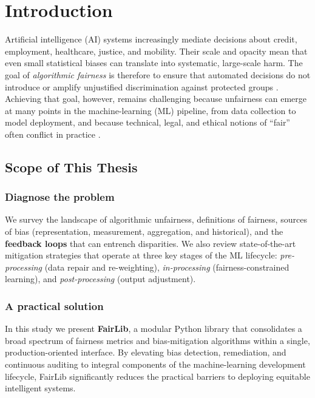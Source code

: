 \documentclass[12pt,a4paper,openright,twoside]{book}
\begin{document}
\tableofcontents   

\mainmatter

\chapter{Introduction}
\label{chap:introduction}
Artificial intelligence (AI) systems increasingly mediate decisions about
credit, employment, healthcare, justice, and mobility.  Their scale and
opacity mean that even small statistical biases can translate into
systematic, large-scale harm.  The goal of \emph{algorithmic fairness} is
therefore to ensure that automated decisions do not introduce or amplify unjustified discrimination against protected groups
\cite{mehrabi2021survey}.  Achieving that goal, however, remains
challenging because unfairness can emerge at many points in the
machine-learning (ML) pipeline, from data collection to model
deployment, and because technical, legal, and ethical notions of
“fair” often conflict in practice \cite{suresh2021framework}.

\section{Scope of This Thesis}
\subsection{Diagnose the problem}
We survey the landscape of algorithmic unfairness, definitions of
fairness, sources of bias (representation, measurement, aggregation,
and historical), and the \textbf{feedback loops} that can entrench disparities.
We also review state-of-the-art mitigation strategies that operate at
three key stages of the ML lifecycle:
\emph{pre-processing} (data repair and re-weighting),
\emph{in-processing} (fairness-constrained learning), and
\emph{post-processing} (output adjustment).

\subsection{A practical solution}
In this study we present \textbf{FairLib}, a modular Python library that consolidates a broad spectrum of fairness metrics and bias-mitigation algorithms within a single, production-oriented interface. By elevating bias detection, remediation, and continuous auditing to integral components of the machine-learning development lifecycle, FairLib significantly reduces the practical barriers to deploying equitable intelligent systems.
\end{document}
